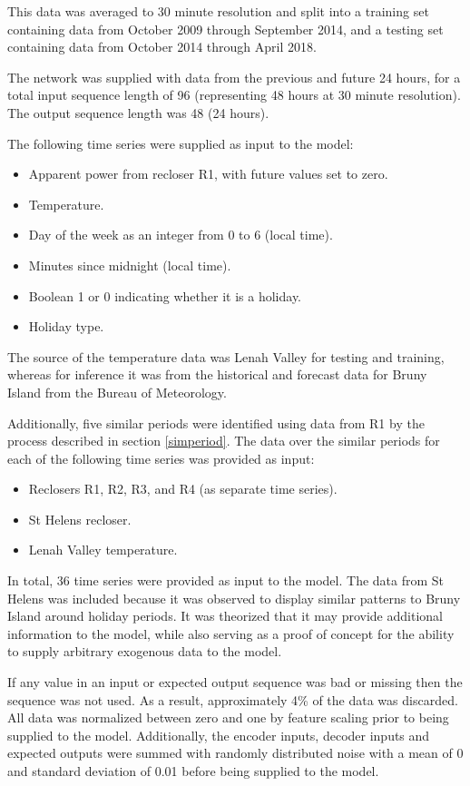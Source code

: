 \documentclass[conference]{IEEEtran}
\begin{document}
This data was averaged to 30 minute resolution and split into a training set containing data from October 2009 through September 2014, and a testing set containing data from October 2014 through April 2018.

The network was supplied with data from the previous and future 24 hours, for a total input sequence length of 96 (representing 48 hours at 30 minute resolution).
The output sequence length was 48 (24 hours).

The following time series were supplied as input to the model:
\begin{itemize}
	\item Apparent power from recloser R1, with future values set to zero.
	\item Temperature.
	\item Day of the week as an integer from 0 to 6 (local time).
	\item Minutes since midnight (local time).
	\item Boolean 1 or 0 indicating whether it is a holiday.
	\item Holiday type.
\end{itemize}

The source of the temperature data was Lenah Valley for testing and training, whereas for inference it was from the historical and forecast data for Bruny Island from the Bureau of Meteorology.

Additionally, five similar periods were identified using data from R1 by the process described in section \ref{simperiod}.
The data over the similar periods for each of the following time series was provided as input:
\begin{itemize}
	\item Reclosers R1, R2, R3, and R4 (as separate time series).
	\item St Helens recloser.
	\item Lenah Valley temperature.
\end{itemize}

In total, 36 time series were provided as input to the model.
The data from St Helens was included because it was observed to display similar patterns to Bruny Island around holiday periods.
It was theorized that it may provide additional information to the model, while also serving as a proof of concept for the ability to supply arbitrary exogenous data to the model.

If any value in an input or expected output sequence was bad or missing then the sequence was not used.
As a result, approximately 4\% of the data was discarded.
All data was normalized between zero and one by feature scaling prior to being supplied to the model.
Additionally, the encoder inputs, decoder inputs and expected outputs were summed with randomly distributed noise with a mean of 0 and standard deviation of 0.01 before being supplied to the model.
\end{document}
